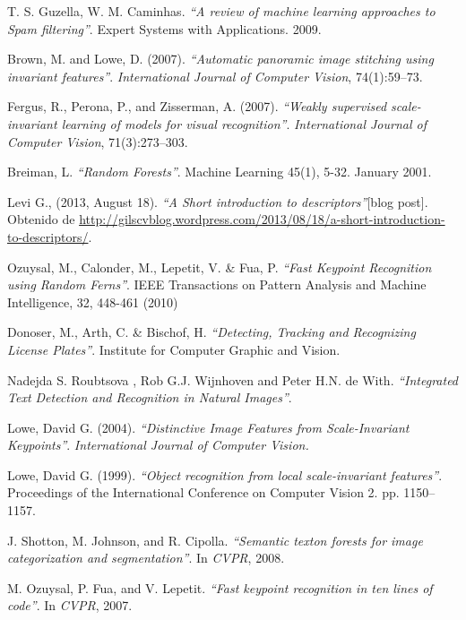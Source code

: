 \begin{thebibliography}{100}
		T. S. Guzella, W. M. Caminhas.
		\emph{``A review of machine learning approaches to Spam filtering''}.
		Expert Systems with Applications.
		2009.
		
		Brown, M. and Lowe, D. (2007).
		\emph{``Automatic panoramic image stitching using invariant features''}.
		\textit{International Journal of Computer Vision},
		74(1):59–73.
	
		Fergus, R., Perona, P., and Zisserman, A. (2007).
		\emph{``Weakly supervised scale-invariant learning of models for visual recognition''}.
		\textit{International Journal of Computer Vision},
		71(3):273–303.
		
		Breiman, L.
		\emph{``Random Forests''}.
		Machine Learning 45(1), 5-32.
		January 2001.
		
				
		Levi G., (2013, August 18).
		\emph{``A Short introduction to descriptors''}[blog post].
		Obtenido de \url{http://gilscvblog.wordpress.com/2013/08/18/a-short-introduction-to-descriptors/}.
	
		Ozuysal, M., Calonder, M., Lepetit, V. \& Fua, P.
		\emph{``Fast Keypoint Recognition using Random Ferns''}.
		IEEE Transactions on Pattern Analysis and Machine Intelligence,
		32, 448-461 (2010)
		
		Donoser, M., Arth, C. \& Bischof, H.
		\emph{``Detecting, Tracking and Recognizing License Plates''}.
		Institute for Computer Graphic and Vision.
		
		Nadejda S. Roubtsova , Rob G.J. Wijnhoven and Peter H.N. de With.
		\emph{``Integrated Text Detection and Recognition in Natural Images''}.
		
		Lowe, David G. (2004).
		\emph{``Distinctive Image Features from Scale-Invariant Keypoints''}.
		\textit{International Journal of Computer Vision.}
		
		Lowe, David G. (1999).
		\emph{``Object recognition from local scale-invariant features''}.
		Proceedings of the International Conference on Computer Vision 2.
		pp. 1150–1157.
		
		J. Shotton, M. Johnson, and R. Cipolla.
		\emph{``Semantic texton forests for image categorization and segmentation''}.
		In \textit{CVPR}, 2008.
		
		M. Ozuysal, P. Fua, and V. Lepetit.
		\emph{``Fast keypoint recognition in ten lines of code''}.
		In \textit{CVPR}, 2007.
		

\end{thebibliography}
